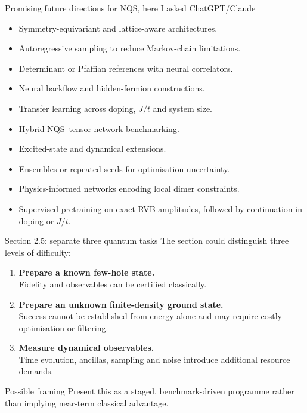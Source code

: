 \documentclass[aspectratio=169,11pt]{beamer}
\begin{document}
\begin{frame}{Promising future directions for NQS, here I asked ChatGPT/Claude}
\begin{itemize}
  \item Symmetry-equivariant and lattice-aware architectures.
  \item Autoregressive sampling to reduce Markov-chain limitations.
  \item Determinant or Pfaffian references with neural correlators.
  \item Neural backflow and hidden-fermion constructions.
  \item Transfer learning across doping, $J/t$ and system size.
  \item Hybrid NQS--tensor-network benchmarking.
  \item Excited-state and dynamical extensions.
  \item Ensembles or repeated seeds for optimisation uncertainty.
  \item Physics-informed networks encoding local dimer constraints.
  \item Supervised pretraining on exact RVB amplitudes, followed by continuation in doping or $J/t$.
\end{itemize}
\end{frame}

\begin{frame}{Section 2.5: separate three quantum tasks}
The section could  distinguish three levels of difficulty:

\begin{enumerate}
  \item \textbf{Prepare a known few-hole state.}\\
  Fidelity and observables can be certified classically.
  \item \textbf{Prepare an unknown finite-density ground state.}\\
  Success cannot be established from energy alone and may require costly optimisation or filtering.
  \item \textbf{Measure dynamical observables.}\\
  Time evolution, ancillas, sampling and noise introduce additional resource demands.
\end{enumerate}

\begin{block}{Possible framing}
Present this as a staged, benchmark-driven programme rather than implying near-term classical advantage.
\end{block}
\end{frame}
\end{document}
